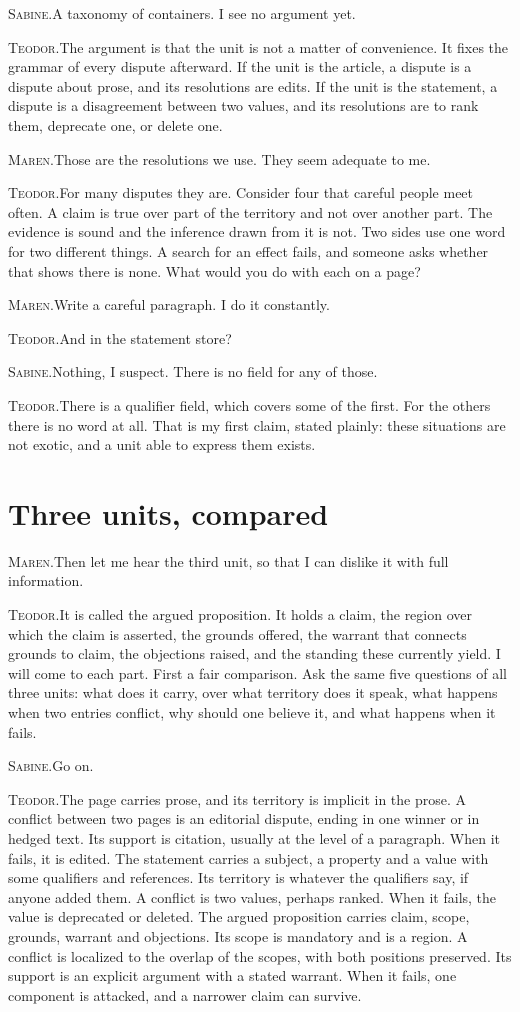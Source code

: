 \documentclass[11pt]{article}
\newcommand{\say}[2]{\par\noindent\textsc{#1.}\enspace #2\par}
\newcommand{\MA}[1]{\say{Maren}{#1}}
\newcommand{\TE}[1]{\say{Teodor}{#1}}
\newcommand{\SA}[1]{\say{Sabine}{#1}}
\begin{document}
\SA{A taxonomy of containers. I see no argument yet.}

\TE{The argument is that the unit is not a matter of convenience. It fixes the grammar of every dispute afterward. If the unit is the article, a dispute is a dispute about prose, and its resolutions are edits. If the unit is the statement, a dispute is a disagreement between two values, and its resolutions are to rank them, deprecate one, or delete one.}

\MA{Those are the resolutions we use. They seem adequate to me.}

\TE{For many disputes they are. Consider four that careful people meet often. A claim is true over part of the territory and not over another part. The evidence is sound and the inference drawn from it is not. Two sides use one word for two different things. A search for an effect fails, and someone asks whether that shows there is none. What would you do with each on a page?}

\MA{Write a careful paragraph. I do it constantly.}

\TE{And in the statement store?}

\SA{Nothing, I suspect. There is no field for any of those.}

\TE{There is a qualifier field, which covers some of the first. For the others there is no word at all. That is my first claim, stated plainly: these situations are not exotic, and a unit able to express them exists.}

\section{Three units, compared}

\MA{Then let me hear the third unit, so that I can dislike it with full information.}

\TE{It is called the argued proposition. It holds a claim, the region over which the claim is asserted, the grounds offered, the warrant that connects grounds to claim, the objections raised, and the standing these currently yield. I will come to each part. First a fair comparison. Ask the same five questions of all three units: what does it carry, over what territory does it speak, what happens when two entries conflict, why should one believe it, and what happens when it fails.}

\SA{Go on.}

\TE{The page carries prose, and its territory is implicit in the prose. A conflict between two pages is an editorial dispute, ending in one winner or in hedged text. Its support is citation, usually at the level of a paragraph. When it fails, it is edited. The statement carries a subject, a property and a value with some qualifiers and references. Its territory is whatever the qualifiers say, if anyone added them. A conflict is two values, perhaps ranked. When it fails, the value is deprecated or deleted. The argued proposition carries claim, scope, grounds, warrant and objections. Its scope is mandatory and is a region. A conflict is localized to the overlap of the scopes, with both positions preserved. Its support is an explicit argument with a stated warrant. When it fails, one component is attacked, and a narrower claim can survive.}
\end{document}
